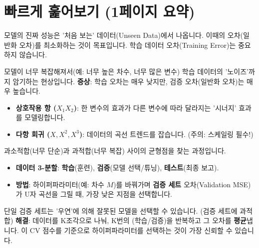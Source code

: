 \documentclass[11pt,a4paper]{book}
\theoremstyle{definition}
\begin{document}
\section{빠르게 훑어보기 (1페이지 요약)}

\begin{tcolorbox}[title={모델링 핵심 요약 카드}]
    
    \begin{tcolorbox}[colback=white, title={\textbf{1. 목표: 일반화 (Generalization)}}]
    모델의 진짜 성능은 '처음 보는' 데이터(Unseen Data)에서 나옵니다.
    이때의 오차(일반화 오차)를 최소화하는 것이 목표입니다. 학습 데이터 오차(Training Error)는 중요하지 않습니다.
    \end{tcolorbox}

    \begin{tcolorbox}[colback=white, title={\textbf{2. 적: 과적합 (Overfitting)}}]
    모델이 너무 복잡해져서(예: 너무 높은 차수, 너무 많은 변수) 학습 데이터의 '노이즈'까지 암기하는 현상입니다.
    \textbf{증상}: 학습 오차는 매우 낮지만, 검증 오차(일반화 오차)는 매우 높습니다.
    \end{tcolorbox}
    
    \begin{tcolorbox}[colback=white, title={\textbf{3. 확장: 비선형 모델링}}]
    \begin{itemize}
        \item \textbf{상호작용 항 ($X_1 X_2$)}: 한 변수의 효과가 다른 변수에 따라 달라지는 '시너지' 효과를 모델링합니다.
        \item \textbf{다항 회귀 ($X, X^2, X^3$)}: 데이터의 곡선 트렌드를 잡습니다. (주의: 스케일링 필수!)
    \end{itemize}
    \end{tcolorbox}

    \begin{tcolorbox}[colback=white, title={\textbf{4. 전략: 모델 선택 (Model Selection)}}]
    과소적합(너무 단순)과 과적합(너무 복잡) 사이의 균형점을 찾는 과정입니다.
    \begin{itemize}
        \item \textbf{데이터 3-분할}: \textbf{학습}(훈련), \textbf{검증}(모델 선택/튜닝), \textbf{테스트}(최종 보고).
        \item \textbf{방법}: 하이퍼파라미터(예: 차수 $M$)를 바꿔가며 \textbf{검증 세트} 오차(Validation MSE)가 U자 곡선을 그릴 때, 가장 낮은 지점을 선택합니다.
    \end{itemize}
    \end{tcolorbox}

    \begin{tcolorbox}[colback=white, title={\textbf{5. 무기: K-겹 교차 검증 (K-Fold CV)}}]
    단일 검증 세트는 '우연'에 의해 잘못된 모델을 선택할 수 있습니다. (검증 세트에 과적합)
    \textbf{해결}: 데이터를 K조각으로 나눠, K번의 (학습/검증)을 반복하고 그 오차를 \textbf{평균}냅니다.
    이 CV 점수를 기준으로 하이퍼파라미터를 선택하는 것이 가장 신뢰할 수 있습니다.
    \end{tcolorbox}
\end{tcolorbox}
\end{document}
